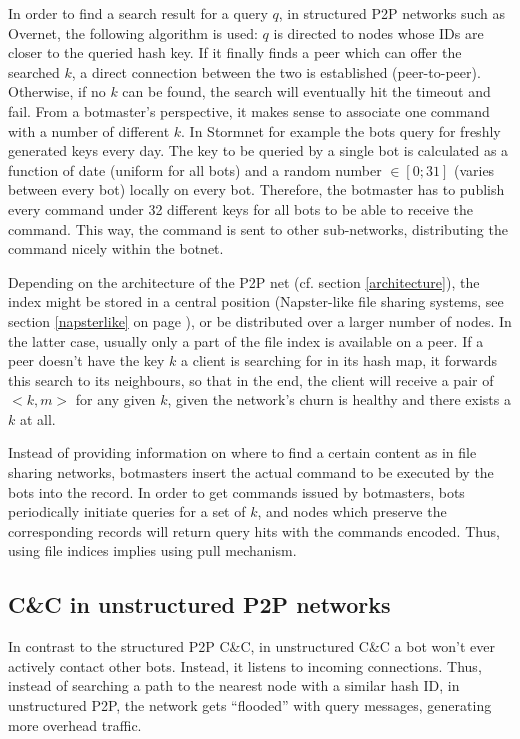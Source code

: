 \documentclass{llncs}
\begin{document}
In order to find a search result for a query $q$, in structured P2P
networks such as Overnet, the following algorithm is used: $q$ is
directed to nodes whose IDs are closer to the queried hash key. If it
finally finds a peer which can offer the searched $k$, a direct
connection between the two is established (peer-to-peer). Otherwise,
if no $k$ can be found, the search will eventually hit the timeout and
fail. From a botmaster's perspective, it makes sense to associate one
command with a number of different $k$. In Stormnet for example the
bots query for freshly generated keys every
day.\cite{wang2009systematic} The key to be queried by a single bot is
calculated as a function of date (uniform for all bots) and a random
number $\in [0;31]$ (varies between every bot) locally on every
bot. Therefore, the botmaster has to publish every command under 32
different keys for all bots to be able to receive the command. This
way, the command is sent to other sub-networks, distributing the
command nicely within the botnet.

Depending on the architecture of the P2P net (cf. section \ref{architecture}),
the index might be stored in a central position (Napster-like file
sharing systems, see section \ref{napsterlike} on page
), or be distributed over a larger number of
nodes.  In the latter case, usually only a part of the file index is
available on a peer. If a peer doesn't have the key $k$ a client is
searching for in its hash map, it forwards this search to its
neighbours, so that in the end, the client will receive a pair of $<k,
m>$ for any given $k$, given the network's churn is healthy and there
exists a $k$ at all.

Instead of providing information on where to find a certain content as
in file sharing networks, botmasters insert the actual command to be
executed by the bots into the record.  In order to get commands issued
by botmasters, bots periodically initiate queries for a set of $k$,
and nodes which preserve the corresponding records will return query
hits with the commands encoded. Thus, using file indices implies using
pull mechanism. \cite{liang2006index}

\subsection{C\&C in unstructured P2P networks}
In contrast to the structured P2P C\&C, in unstructured C\&C a bot
won't ever actively contact other bots. Instead, it listens to
incoming connections.  \cite{li2009botnet} Thus, instead of searching
a path to the nearest node with a similar hash ID, in unstructured
P2P, the network gets ``flooded'' with query messages, generating more
overhead traffic.
\end{document}
